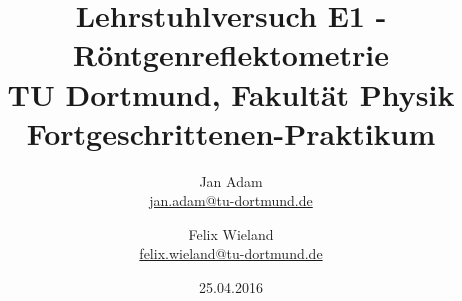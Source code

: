 



\title{Lehrstuhlversuch E1 - Röntgenreflektometrie\\				%
	\large TU Dortmund, Fakultät Physik\\ 
	\normalsize Fortgeschrittenen-Praktikum}

\author{Jan Adam\\			%
	{\small \href{jan.adam@tu-dortmund.de}{jan.adam@tu-dortmund.de}}	%
	\and						%
	Felix Wieland\\					%
	{\small \href{felix.wieland@tu-dortmund.de}{felix.wieland@tu-dortmund.de}}		%
}
\date{25.04.2016}				%



	

\maketitle					%
\thispagestyle{empty} 				%



\tableofcontents


\newpage					%


